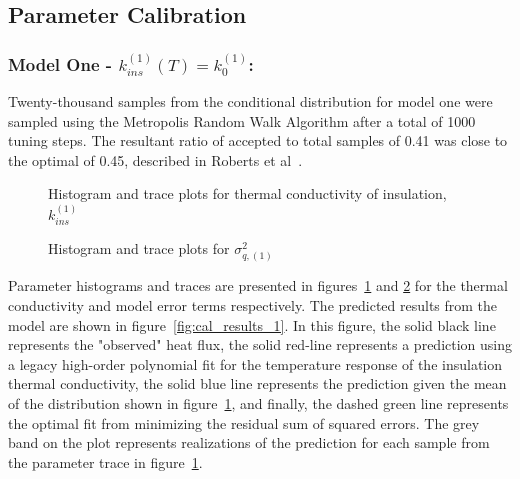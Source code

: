 \documentclass[article]{proc}
\begin{document}

    \subsection{Parameter Calibration}

        \subsubsection{Model One - $k^{(1)}_{ins}(T) = k^{(1)}_0$:}

        Twenty-thousand samples from the conditional distribution for model one were sampled using the Metropolis Random Walk Algorithm after a total of 1000 tuning steps. The resultant ratio of accepted to total samples of 0.41 was close to the optimal of 0.45, described in Roberts et al~\cite{Roberts:1997}.

        \begin{figure}[b!]
            \centering
            \qquad
            \caption{Histogram and trace plots for thermal conductivity of insulation, $k^{(1)}_{ins}$}
            \label{fig:param_trace_1}
        \end{figure}

        \begin{figure}[b!]
            \centering
            \qquad
            \caption{Histogram and trace plots for $\sigma_{q,(1)}^2$}
            \label{fig:sigma_trace_1}
        \end{figure}

        Parameter histograms and traces are presented in figures~\ref{fig:param_trace_1} and \ref{fig:sigma_trace_1} for the thermal conductivity and model error terms respectively. The predicted results from the model are shown in figure~\ref{fig:cal_results_1}. In this figure, the solid black line represents the "observed" heat flux, the solid red-line represents a prediction using a legacy high-order polynomial fit for the temperature response of the insulation thermal conductivity, the solid blue line represents the prediction given the mean of the distribution shown in figure~\ref{fig:param_trace_1}, and finally, the dashed green line represents the optimal fit from minimizing the residual sum of squared errors. The grey band on the plot represents realizations of the prediction for each sample from the parameter trace in figure~\ref{fig:param_trace_1}. 
\end{document}
